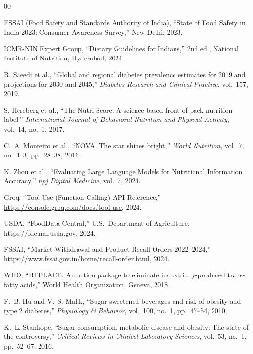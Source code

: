 \documentclass[conference]{IEEEtran}
\begin{document}
\begin{thebibliography}{00}

FSSAI (Food Safety and Standards Authority of India),
``State of Food Safety in India 2023: Consumer Awareness Survey,''
New Delhi, 2023.

ICMR-NIN Expert Group,
``Dietary Guidelines for Indians,'' 2nd ed.,
National Institute of Nutrition, Hyderabad, 2024.

R. Saeedi et al.,
``Global and regional diabetes prevalence estimates for 2019 and projections for
2030 and 2045,''
\textit{Diabetes Research and Clinical Practice}, vol.~157, 2019.

S. Hercberg et al.,
``The Nutri-Score: A science-based front-of-pack nutrition label,''
\textit{International Journal of Behavioral Nutrition and Physical Activity},
vol.~14, no.~1, 2017.

C.~A. Monteiro et al.,
``NOVA. The star shines bright,''
\textit{World Nutrition}, vol.~7, no.~1--3, pp.~28--38, 2016.

K. Zhou et al.,
``Evaluating Large Language Models for Nutritional Information Accuracy,''
\textit{npj Digital Medicine}, vol.~7, 2024.

Groq,
``Tool Use (Function Calling) API Reference,''
\url{https://console.groq.com/docs/tool-use}, 2024.

USDA,
``FoodData Central,'' U.S.\ Department of Agriculture,
\url{https://fdc.nal.usda.gov}, 2024.

FSSAI,
``Market Withdrawal and Product Recall Orders 2022--2024,''
\url{https://www.fssai.gov.in/home/recall-order.html}, 2024.

WHO,
``REPLACE: An action package to eliminate industrially-produced trans-fatty acids,''
World Health Organization, Geneva, 2018.

F.~B. Hu and V.~S. Malik,
``Sugar-sweetened beverages and risk of obesity and type 2 diabetes,''
\textit{Physiology \& Behavior}, vol.~100, no.~1, pp.~47--54, 2010.

K.~L. Stanhope,
``Sugar consumption, metabolic disease and obesity: The state of the controversy,''
\textit{Critical Reviews in Clinical Laboratory Sciences},
vol.~53, no.~1, pp.~52--67, 2016.

\end{thebibliography}
\end{document}

